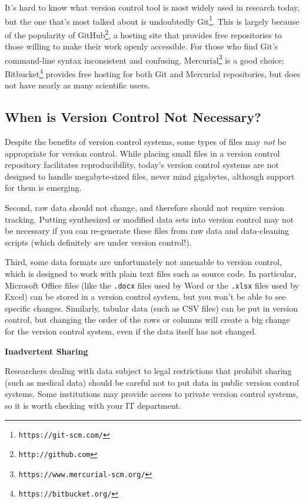 \documentclass[10pt]{article}
\newcommand{\withurl}[2]{{#1}\footnote{\texttt{#2}}}
\begin{document}
It's hard to know what version control tool is most widely used in
research today, but the one that's most talked about is undoubtedly
\withurl{Git}{https://git-scm.com/}.  This is largely because of the
popularity of \withurl{GitHub}{http://github.com}, a hosting site that
provides free repositories to those willing to make their work openly
accessible.  For those who find Git's command-line syntax inconsistent
and confusing, \withurl{Mercurial}{https://www.mercurial-scm.org/} is
a good choice; \withurl{Bitbucket}{https://bitbucket.org/} provides
free hosting for both Git and Mercurial repositories, but does not
have nearly as many scientific users.

\subsection*{When is Version Control Not Necessary?}

Despite the benefits of version control systems, some types of files
may \emph{not} be appropriate for version control. While placing small
files in a version control repository facilitates reproducibility,
today's version control systems are not designed to handle
megabyte-sized files, never mind gigabytes, although support for them
is emerging.

Second, raw data should not change, and therefore should not require
version tracking. Putting synthesized or modified data sets into
version control may not be necessary if you can re-generate these
files from raw data and data-cleaning scripts (which definitely
\emph{are} under version control!).

Third, some data formats are unfortunately not amenable to version
control, which is designed to work with plain text files such as
source code.  In particular, Microsoft Office files (like the
\texttt{.docx} files used by Word or the \texttt{.xlsx} files used by
Excel) can be stored in a version control system, but you won't be
able to see specific changes. Similarly, tabular data (such as CSV
files) can be put in version control, but changing the order of the
rows or columns will create a big change for the version control
system, even if the data itself has not changed.

\begin{framed}
  \noindent \textbf{Inadvertent Sharing}

  Researchers dealing with data subject to legal restrictions that
  prohibit sharing (such as medical data) should be careful not to put
  data in public version control systems. Some institutions may
  provide access to private version control systems, so it is worth
  checking with your IT department.
\end{framed}
\end{document}
